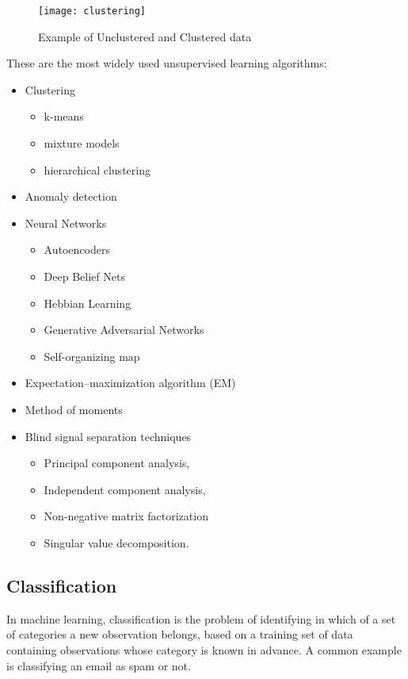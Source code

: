 \begin{figure}[H]
	\centering
	\texttt{[image: clustering]}
	\caption{Example of Unclustered and Clustered data \cite{kmeans}}
	\label{fig:clustering}
\end{figure}	

These are the most widely used unsupervised learning algorithms:

\begin{itemize}[noitemsep]
	\item Clustering
	\begin{itemize}[noitemsep]
		\item k-means
		\item mixture models
		\item hierarchical clustering
	\end{itemize}
	\item Anomaly detection
	\item Neural Networks
	\begin{itemize}[noitemsep]
		\item Autoencoders
		\item Deep Belief Nets
		\item Hebbian Learning
		\item Generative Adversarial Networks
		\item Self-organizing map
	\end{itemize}
	\item Expectation–maximization algorithm (EM)
	\item Method of moments
	\item Blind signal separation techniques
	\begin{itemize}[noitemsep]
		\item Principal component analysis,
		\item Independent component analysis,
		\item Non-negative matrix factorization
		\item Singular value decomposition.
	\end{itemize}
\end{itemize}

\subsection{Classification} \label{classification}
In machine learning, classification is the problem of identifying in which of a set of categories a new observation belongs, based on a training set of data containing observations whose category is known in advance. A common example is classifying an email as spam or not.\\

